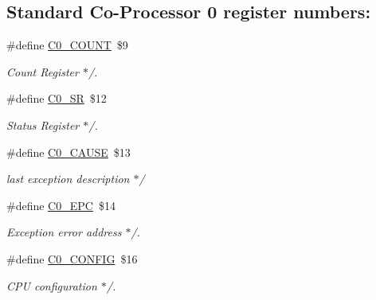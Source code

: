 \subsection*{Standard Co-\/\+Processor 0 register numbers\+:}
\begin{DoxyCompactItemize}
\item 
\mbox{\label{group__mips__regs_gab326a844722de29e1696afc52cf9d1b1}} 
\#define \mbox{\hyperlink{group__mips__regs_gab326a844722de29e1696afc52cf9d1b1}{C0\+\_\+\+C\+O\+U\+NT}}~\$9
\begin{DoxyCompactList}\small\item\em Count Register $\ast$/. \end{DoxyCompactList}\item 
\mbox{\label{group__mips__regs_gad08be68adf81675768214e01ca7d1291}} 
\#define \mbox{\hyperlink{group__mips__regs_gad08be68adf81675768214e01ca7d1291}{C0\+\_\+\+SR}}~\$12
\begin{DoxyCompactList}\small\item\em Status Register $\ast$/. \end{DoxyCompactList}\item 
\mbox{\label{group__mips__regs_gabd462e0cd80cc5aa92d65a0f474f6f07}} 
\#define \mbox{\hyperlink{group__mips__regs_gabd462e0cd80cc5aa92d65a0f474f6f07}{C0\+\_\+\+C\+A\+U\+SE}}~\$13
\begin{DoxyCompactList}\small\item\em last exception description $\ast$/ \end{DoxyCompactList}\item 
\mbox{\label{group__mips__regs_ga8bc09513b6b3182942f4aae7e65e2a1d}} 
\#define \mbox{\hyperlink{group__mips__regs_ga8bc09513b6b3182942f4aae7e65e2a1d}{C0\+\_\+\+E\+PC}}~\$14
\begin{DoxyCompactList}\small\item\em Exception error address $\ast$/. \end{DoxyCompactList}\item 
\mbox{\label{group__mips__regs_ga3a4ee4854636c95eac8d7ce5e7e9328a}} 
\#define \mbox{\hyperlink{group__mips__regs_ga3a4ee4854636c95eac8d7ce5e7e9328a}{C0\+\_\+\+C\+O\+N\+F\+IG}}~\$16
\begin{DoxyCompactList}\small\item\em C\+PU configuration $\ast$/. \end{DoxyCompactList}\end{DoxyCompactItemize}
